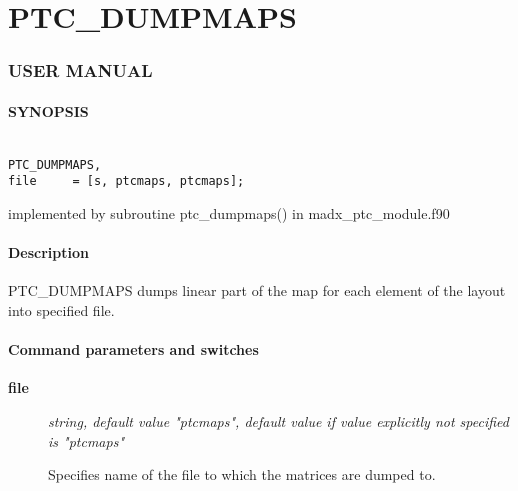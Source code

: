 


\section{PTC\_DUMPMAPS}





\subsubsection{   USER MANUAL   }


\paragraph{SYNOPSIS}
\begin{verbatim}

PTC_DUMPMAPS, 
file     = [s, ptcmaps, ptcmaps];
\end{verbatim}
  implemented by subroutine ptc\_dumpmaps() in madx\_ptc\_module.f90   


\paragraph{ Description } PTC\_DUMPMAPS dumps linear part of the map for each element  of the layout into specified file.  


\paragraph{ Command parameters and switches }
\begin{description}
	\item[\textbf{file}] \textit{ string, default value "ptcmaps",  default value if value explicitly not specified is "ptcmaps"}

 Specifies name of the file to which the matrices are dumped to.   
\end{description}

